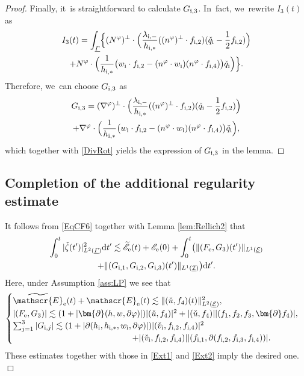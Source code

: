 \documentclass[JEP,XML,SOM,Unicode,NoFloatCountersInSection,published]{cedram}
\newcommand{\cI}{{\mathcal I}}
\newcommand{\cE}{{\mathcal E}}
\newcommand{\ul}[1]{\underline{#1}}
\newcommand{\itGamma}{\mathit{\Gamma}}
\theoremstyle{definition}
\begin{document}
\begin{proof}
Finally, it~is straightforward to calculate $G_{{\rm i},3}$. In~fact, we~rewrite $I_3(t)$ as
\begin{multline*}
I_3(t)
= \int_{\ul{\itGamma}}\Bigl\{
(N^\varphi)^\perp\cdot \Bigl(\frac{\lambda_{{\rm i},-}}{h_{{\rm i},*}} ((n^\varphi)^\perp\cdot f_{{\rm i},2})(\check{q}_\mathrm{i}-\frac12 f_{{\rm i},2}) \Bigr) \\
+ N^\varphi\cdot \Bigl(\frac{1}{h_{{\rm i},*}}\bigl(w_\mathrm{i}\cdot f_{{\rm i},2}-(n^\varphi\cdot w_\mathrm{i})(n^\varphi\cdot f_{{\rm i},4})
\bigr) \check{q}_\mathrm{i} \Bigr) \Bigr\}.
\end{multline*}
Therefore, we~can choose $G_{{\rm i},3}$ as
\begin{multline*}
G_{{\rm i},3}
= (\nabla^\varphi)^\perp\cdot \Bigl(\frac{\lambda_{{\rm i},-}}{h_{{\rm i},*}} ((n^\varphi)^\perp\cdot f_{{\rm i},2})
(\check{q}_\mathrm{i}-\frac12 f_{{\rm i},2}) \Bigr) \\
+ \nabla^\varphi\cdot \Bigl(\frac{1}{h_{{\rm i},*}}
\bigl(w_\mathrm{i}\cdot f_{{\rm i},2}-(n^\varphi\cdot w_\mathrm{i})(n^\varphi\cdot f_{{\rm i},4}) \bigr)\check{q}_\mathrm{i} \Bigr),
\end{multline*}
which together with \eqref{DivRot} yields the expression of $G_{{\rm i},3}$ in the lemma.
\end{proof}

\subsection{Completion of the additional regularity estimate}
It follows from \eqref{EqCF6} together with Lemma \ref{lem:Rellich2} that
\begin{multline*}
\int_0^t|\check{\zeta}(t')|_{L^2(\ul{\itGamma})}^2\mathrm{d}t'
\lesssim \widetilde{\mathscr{E}}_\mathrm{e}(t) + \mathscr{E}_\mathrm{e}(0) + \int_0^t \bigl(\|(F_\mathrm{e},G_3)(t')\|_{L^1(\ul{\cE})} \\
+ \|(G_{{\rm i},1},G_{{\rm i},2},G_{{\rm i},3})(t')\|_{L^1(\ul{\cI})} \bigr){\rm d}t'.
\end{multline*}
Here, under Assumption \ref{ass:LP} we see that
\[
\begin{cases}
\widetilde{\mathscr{E}}_\mathrm{e}(t) + \mathscr{E}_\mathrm{e}(t) \lesssim \|(\check{u},f_4)(t)\|_{L^2(\ul{\cE})}^2, \\
|(F_\mathrm{e},G_3)| \lesssim (1+|\bm{\partial}(h,w,\partial\varphi)|)|(\check{u},f_4)|^2 + |(\check{u},f_4)||(f_1,f_2,f_3,\bm{\partial}f_4)|, \\
\sum_{j=1}^3|G_{{\rm i},j}| \lesssim (1+|\partial(h_\mathrm{i},h_{{\rm i},*},w_\mathrm{i},\partial\varphi)|)|(\check{v}_\mathrm{i},f_{{\rm i},2},f_{{\rm i},4})|^2 \\
\hspace*{5cm}
+ |(\check{v}_\mathrm{i},f_{{\rm i},2},f_{{\rm i},4})||(f_{{\rm i},1},\partial(f_{{\rm i},2},f_{{\rm i},3},f_{{\rm i},4}))|.
\end{cases}
\]
These estimates together with those in \eqref{Ext1} and \eqref{Ext2} imply the desired one.
\hfill$\Box$
\end{document}
